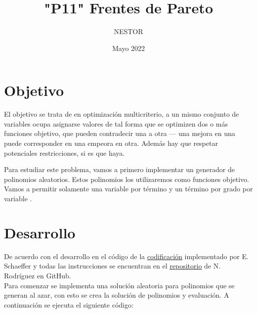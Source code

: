 \documentclass{article}
\title{"P11" Frentes de Pareto} %
\author{NESTOR}
\date{Mayo 2022}
\begin{document}

\maketitle %


 

\section{Objetivo}
El objetivo se trata de en optimización multicriterio, a un mismo conjunto de variables ocupa asignarse valores de tal forma que se optimizen dos o más funciones objetivo, que pueden contradecir una a otra — una mejora en una puede corresponder en una empeora en otra. Además hay que respetar potenciales restricciones, si es que haya.

Para estudiar este problema, vamos a primero implementar un generador de polinomios aleatorios. Estos polinomios los utilizaremos como funciones objetivo. Vamos a permitir solamente una variable por término y un término por grado por variable \cite{elisa1}.

\section{Desarrollo}\label{des}
De acuerdo con el desarrollo en el código de la  \href{https://github.com/satuelisa/Simulation/blob/master/ParetoFronts/poligen.py}{codificación} implementado por E. Schaeffer y todas las instrucciones se encuentran en el  \href{https://github.com/NestorZeus/SIMULACION-COMPUTACIONAL-DE-NANOMATERIALES/tree/main/P11}{repositorio} de N. Rodríguez en GitHub.\\

Para comenzar se implementa una solución aleatoria para polinomios que se generan al azar, con esto se crea la solución de polinomios y evaluación. A continuación se ejecuta el siguiente código:
\end{document}
